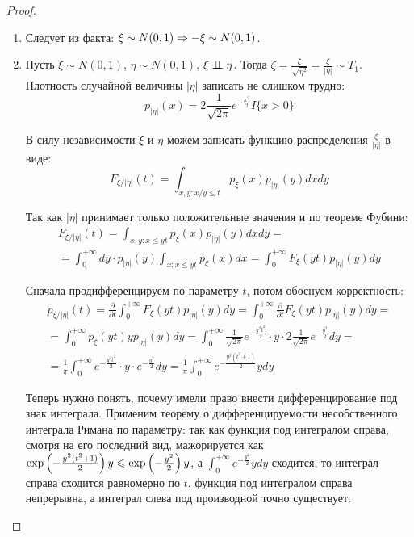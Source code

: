 \begin{proof}~
    \begin{enumerate}
        \item Следует из факта: $\xi \sim N(0, 1) \Rightarrow -\xi \sim N(0, 1)$.

        \item Пусть $\xi \sim N(0, 1)$, $\eta \sim N(0, 1)$, $\xi \perp\mkern-9.5mu\perp \eta$. Тогда $\zeta = \frac{\xi}{\sqrt{\eta^2}} = \frac{\xi}{|\eta|} \sim T_1$. Плотность случайной величины $|\eta|$ записать не слишком трудно:
        \[
            p_{|\eta|}(x) = 2 \frac{1}{\sqrt{2 \pi}} e^{-\frac{x^2}{2}} I\{x > 0\}
        \]
        
        В силу независимости $\xi$ и $\eta$ можем записать функцию распределения $\frac{\xi}{|\eta|}$ в виде:
        \[
            F_{\xi / |\eta|}(t) = \int_{x, y \colon x/y \le t} p_\xi(x) p_{|\eta|}(y) dx dy
        \]

        Так как $|\eta|$ принимает только положительные значения и по теореме Фубини:
        \begin{multline*}
            F_{\xi / |\eta|}(t) = \int_{x, y \colon x \le yt} p_\xi(x) p_{|\eta|}(y) dx dy =
            \\
            = \int_0^{+\infty} dy \cdot p_{|\eta|}(y) \int_{x \colon x \le yt} p_\xi(x) dx = \int_0^{+\infty} F_\xi(yt) p_{|\eta|}(y) dy
        \end{multline*}

        Сначала продифференцируем по параметру $t$, потом обоснуем корректность:
        \begin{multline*}
            p_{\xi / |\eta|}(t) = \frac{\partial}{\partial t} \int_0^{+\infty} F_\xi(yt) p_{|\eta|}(y) dy = \int_0^{+\infty} \frac{\partial}{\partial t} F_\xi(yt) p_{|\eta|}(y) dy =
            \\
            = \int_0^{+\infty} p_\xi(yt) y p_{|\eta|}(y) dy = \int_0^{+\infty} \frac{1}{\sqrt{2 \pi}} e^{-\frac{y^2t^2}{2}} \cdot y \cdot 2 \frac{1}{\sqrt{2 \pi}} e^{-\frac{y^2}{2}} dy =
            \\
            = \frac{1}{\pi} \int_0^{+\infty} e^{-\frac{y^2t^2}{2}} \cdot y \cdot e^{-\frac{y^2}{2}} dy = \frac{1}{\pi} \int_0^{+\infty} e^{-\frac{y^2(t^2+1)}{2}} y dy
        \end{multline*}

        Теперь нужно понять, почему имели право внести дифференцирование под знак интеграла. Применим теорему о дифференцируемости несобственного интеграла Римана по параметру: так как функция под интегралом справа, смотря на его последний вид, мажорируется как $\exp\left(-\frac{y^2(t^2+1)}{2}\right) y \leqslant \exp\left(-\frac{y^2}{2}\right) y$, а $\int_0^{+\infty} e^{-\frac{y^2}{2}} y dy$ сходится, то интеграл справа сходится равномерно по $t$, функция под интегралом справа непрерывна, а интеграл слева под производной точно существует.


\end{enumerate}
\end{proof}
